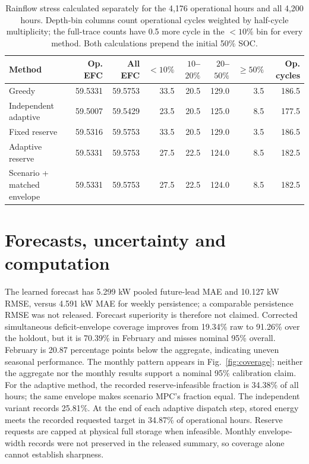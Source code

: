 \documentclass[journal]{IEEEtran}
\begin{document}
\begin{table}[t]
\centering\small
\begin{tabular}{lrrrrrrr}
\toprule
Method & Op. EFC & All EFC & $<10\%$ & $10$--$20\%$ & $20$--$50\%$ & $\geq 50\%$ & Op. cycles \\
\midrule
Greedy & 59.5331 & 59.5753 & 33.5 & 20.5 & 129.0 & 3.5 & 186.5 \\
Independent adaptive & 59.5007 & 59.5429 & 23.5 & 20.5 & 125.0 & 8.5 & 177.5 \\
Fixed reserve & 59.5316 & 59.5753 & 33.5 & 20.5 & 129.0 & 3.5 & 186.5 \\
Adaptive reserve & 59.5331 & 59.5753 & 27.5 & 22.5 & 124.0 & 8.5 & 182.5 \\
Scenario + matched envelope & 59.5331 & 59.5753 & 27.5 & 22.5 & 124.0 & 8.5 & 182.5 \\
\bottomrule
\end{tabular}
\caption{Rainflow stress calculated separately for the 4,176 operational hours and all 4,200 hours. Depth-bin columns count operational cycles weighted by half-cycle multiplicity; the full-trace counts have 0.5 more cycle in the $<10\%$ bin for every method. Both calculations prepend the initial 50\% SOC.}\label{tab:rainflow}
\end{table}

\section{Forecasts, uncertainty and computation}
The learned forecast has 5.299 kW pooled future-lead MAE and 10.127 kW RMSE, versus 4.591 kW MAE for weekly persistence; a comparable persistence RMSE was not released. Forecast superiority is therefore not claimed. Corrected simultaneous deficit-envelope coverage improves from 19.34\% raw to 91.26\% over the holdout, but it is 70.39\% in February and misses nominal 95\% overall. February is 20.87 percentage points below the aggregate, indicating uneven seasonal performance. The monthly pattern appears in Fig.~\ref{fig:coverage}; neither the aggregate nor the monthly results support a nominal 95\% calibration claim. For the adaptive method, the recorded reserve-infeasible fraction is 34.38\% of all hours; the same envelope makes scenario MPC's fraction equal. The independent variant records 25.81\%. At the end of each adaptive dispatch step, stored energy meets the recorded requested target in 34.87\% of operational hours. Reserve requests are capped at physical full storage when infeasible. Monthly envelope-width records were not preserved in the released summary, so coverage alone cannot establish sharpness.
\end{document}
